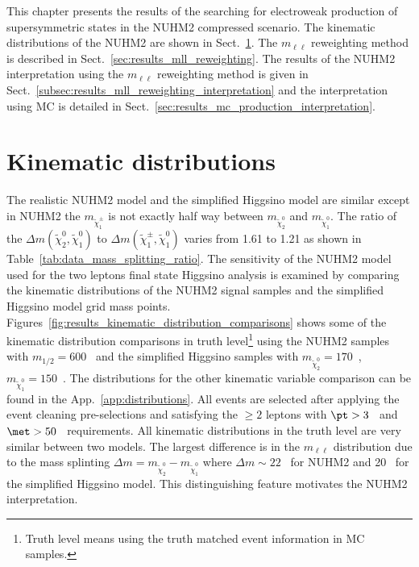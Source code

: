 This chapter presents the results of the searching for electroweak production of supersymmetric states in the NUHM2 compressed scenario.
The kinematic distributions of the NUHM2 are shown in Sect.~\ref{sec:results_kinematic_distributions}.
The $m_{\ell \ell}$ reweighting method is described in Sect.~\ref{sec:results_mll_reweighting}.
The results of the NUHM2 interpretation using the $m_{\ell \ell}$ reweighting method is given in Sect.~\ref{subsec:results_mll_reweighting_interpretation} and the interpretation using MC is detailed in Sect.~\ref{sec:results_mc_production_interpretation}.


\section{Kinematic distributions}
\label{sec:results_kinematic_distributions}
The realistic NUHM2 model and the simplified Higgsino model are similar except in NUHM2 the $m_{\widetilde{\chi}^{\pm}_{1}}$ is not exactly half way between $m_{\widetilde{\chi}^{0}_{2}}$ and $m_{\widetilde{\chi}^{0}_{1}}$.
The ratio of the $\Delta m(\widetilde{\chi}^{0}_{2}, \widetilde{\chi}^{0}_{1})$ to $\Delta m(\widetilde{\chi}^{\pm}_{1}, \widetilde{\chi}^{0}_{1})$ varies from 1.61 to 1.21 as shown in Table~\ref{tab:data_mass_splitting_ratio}.
The sensitivity of the NUHM2 model used for the two leptons final state Higgsino analysis is examined by comparing the kinematic distributions of the NUHM2 signal samples and the simplified Higgsino model grid mass points.
Figures~\ref{fig:results_kinematic_distribution_comparisons} shows some of the kinematic distribution comparisons in truth level\footnote{Truth level means using the truth matched event information in MC samples.} using the NUHM2 samples with $m_{1/2} = 600$~{\GeV} and the simplified Higgsino samples with $m_{\widetilde{\chi}^{0}_{2}} = 170$~{\GeV}, $m_{\widetilde{\chi}^{0}_{1}} = 150$~{\GeV}.
The distributions for the other kinematic variable comparison can be found in the App.~\ref{app:distributions}.
All events are selected after applying the event cleaning pre-selections and satisfying the $\ge 2$ leptons with $\pt > 3$~{\GeV} and $\met > 50$~{\GeV} requirements.
All kinematic distributions in the truth level are very similar between two models.
The largest difference is in the $m_{\ell \ell}$ distribution due to the mass splinting $\Delta m = m_{\widetilde{\chi}^{0}_{2}} - m_{\widetilde{\chi}^{0}_{1}}$ where $\Delta m \sim 22$~{\GeV} for NUHM2 and 20~{\GeV} for the simplified Higgsino model.
This distinguishing feature motivates the NUHM2 interpretation.

